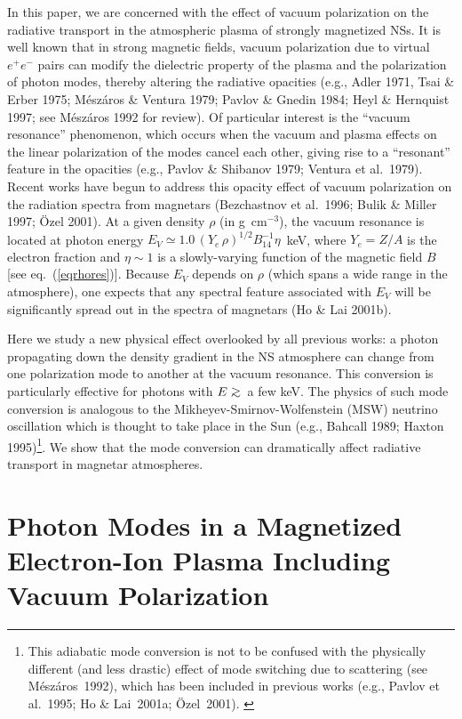 \documentclass{aastex}
\def\go{\mathrel{\raise.3ex\hbox{$>$}\mkern-14mu
             \lower0.6ex\hbox{$\sim$}}}
\begin{document}
In this paper, we are concerned with the effect of vacuum polarization
on the radiative transport in the atmospheric plasma of
strongly magnetized NSs. It is well known that in
strong magnetic fields, vacuum polarization due to virtual $e^+e^-$
pairs can modify the dielectric property of the plasma and the
polarization of photon modes, thereby altering the radiative opacities
(e.g., Adler 1971, Tsai \& Erber 1975; M\'{e}sz\'{a}ros \& Ventura 1979;
Pavlov \& Gnedin 1984; Heyl \& Hernquist 1997; see M\'{e}sz\'{a}ros 1992 for
review). Of particular interest is the ``vacuum resonance'' phenomenon,
which occurs when the vacuum and plasma effects on the linear polarization
of the modes cancel each other, giving rise to a ``resonant'' feature in the
opacities (e.g., Pavlov \& Shibanov 1979; Ventura et al.~1979).
Recent works have begun to address this opacity effect of
vacuum polarization on the radiation spectra from magnetars
(Bezchastnov et al.~1996; Bulik \& Miller 1997; \"Ozel 2001).
At a given density $\rho$ (in g~cm$^{-3}$), the vacuum 
resonance is located at photon energy $E_V
\simeq 1.0\,(Y_e\,\rho)^{1/2}B_{14}^{-1}\eta$~keV, where
$Y_e=Z/A$ is the electron fraction and $\eta\sim 1$ is a
slowly-varying function of the magnetic field $B$ [see eq.~(\ref{eqrhores})].
Because $E_V$ depends on $\rho$ (which spans a wide range in the atmosphere),
one expects that any spectral feature associated with $E_V$ will be
significantly spread out in the spectra of magnetars (Ho \& Lai 2001b).

Here we study a new physical effect overlooked by all previous works:
a photon propagating down the density gradient in the NS
atmosphere can change from one polarization mode to another
at the vacuum resonance. This conversion is particularly effective 
for photons with $E\go$~a few keV. The physics of such mode conversion 
is analogous to the Mikheyev-Smirnov-Wolfenstein (MSW) 
neutrino oscillation which is thought to take place in the Sun (e.g., Bahcall
1989; Haxton 1995)\footnote{
This adiabatic mode conversion is not to be confused with the
physically different (and less drastic) effect of mode
switching due to scattering (see M\'{e}sz\'{a}ros~1992),
which has been included in previous works (e.g., Pavlov et al.~1995;
Ho \& Lai~2001a; \"{O}zel~2001).  \label{foot:mcscat}
}. We show that the mode conversion can dramatically 
affect radiative transport in magnetar atmospheres.


\section{Photon Modes in a Magnetized Electron-Ion
Plasma Including Vacuum Polarization}
\end{document}
